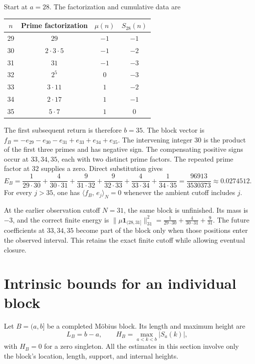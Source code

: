 \documentclass[11pt]{article}
\theoremstyle{definition}
\theoremstyle{remark}
\newcommand{\ip}[2]{\langle #1,\, #2\rangle}
\begin{document}
Start at $a=28$. The factorization and cumulative data are
\begin{center}
\begin{tabular}{cccc}
\toprule
$n$ & Prime factorization & $\mu(n)$ & $S_{28}(n)$\\
\midrule
29 & $29$ & $-1$ & $-1$\\
30 & $2\cdot3\cdot5$ & $-1$ & $-2$\\
31 & $31$ & $-1$ & $-3$\\
32 & $2^5$ & $0$ & $-3$\\
33 & $3\cdot11$ & $1$ & $-2$\\
34 & $2\cdot17$ & $1$ & $-1$\\
35 & $5\cdot7$ & $1$ & $0$\\
\bottomrule
\end{tabular}
\end{center}
The first subsequent return is therefore $b=35$. The block vector is $f_B=-e_{29}-e_{30}-e_{31}+e_{33}+e_{34}+e_{35}$. The intervening integer $30$ is the product of the first three primes and has negative sign. The compensating positive signs occur at $33,34,35$, each with two distinct prime factors. The repeated prime factor at $32$ supplies a zero. Direct substitution gives
\begin{equation}\label{eq:EB29}
E_B=\frac1{29\cdot30}+\frac4{30\cdot31}+\frac9{31\cdot32}+\frac9{32\cdot33}+\frac4{33\cdot34}+\frac1{34\cdot35}=\frac{96913}{3530373}\approx0.0274512.
\end{equation}
For every $j>35$, one has $\ip{f_B}{e_j}_N=0$ whenever the ambient cutoff includes $j$.

At the earlier observation cutoff $N=31$, the same block is unfinished. Its mass is $-3$, and the correct finite energy is $\|\mu\mathbf 1_{(28,31]}\|_{31}^2=\frac1{29\cdot30}+\frac4{30\cdot31}+\frac9{31}$. The future coefficients at $33,34,35$ become part of the block only when those positions enter the observed interval. This retains the exact finite cutoff while allowing eventual closure.

\section{Intrinsic bounds for an individual block}\label{sec:intrinsic}

Let $B=(a,b]$ be a completed M\"obius block. Its length and maximum height are
\begin{equation}
L_B=b-a,\qquad H_B=\max_{a<k<b}|S_a(k)|,
\end{equation}
with $H_B=0$ for a zero singleton. All the estimates in this section involve only the block's location, length, support, and internal heights.
\end{document}
